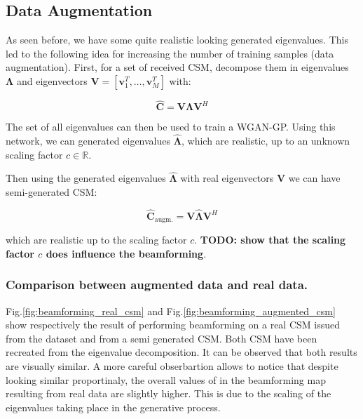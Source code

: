 \documentclass{article}
\begin{document}
\subsection{Data Augmentation}

As seen before, we have some quite realistic looking generated eigenvalues. This led to the following idea for increasing the number of training samples (data augmentation). First, for a set of received CSM, decompose them in eigenvalues $\mathbf{\Lambda}$  and eigenvectors $\mathbf{V} = [\mathbf{v}_1^T, \dots, \mathbf{v}_M^T]$ with:

\begin{equation}
    \mathbf{\hat{C}} = \mathbf{V} \mathbf{\Lambda} \mathbf{V}^H
\end{equation}


The set of all eigenvalues can then be used to train a WGAN-GP. Using this network, we can generated eigenvalues $\hat{\mathbf{\Lambda}}$, which are realistic, up to an unknown scaling factor $c \in \mathbb{R}$.  


Then using the generated eigenvalues $\hat{\mathbf{\Lambda}}$ with real eigenvectors $\mathbf{V}$ we can have semi-generated CSM:

\begin{equation}
    \mathbf{\hat{C}}_\text{augm.}  = \mathbf{V} \hat{\mathbf{\Lambda}} \mathbf{V}^H
\end{equation}

which are realistic up to the scaling factor $c$. \textbf{TODO: show that the scaling factor $c$ does influence the beamforming}.

\subsubsection{Comparison between augmented data and real data.}


Fig.\ref{fig:beamforming_real_csm} and Fig.\ref{fig:beamforming_augmented_csm} show respectively the result of performing beamforming on a real CSM issued from the dataset and from a semi generated CSM. Both CSM have been recreated from the eigenvalue decomposition. It can be observed that both results are visually similar. A more careful obserbartion allows to notice that despite looking similar proportinaly, the overall values of in the beamforming map resulting from real data are slightly higher. This is due to the scaling of the eigenvalues taking place in the generative process. 
\end{document}
